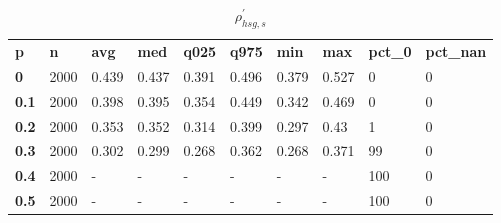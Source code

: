 \begin{table}[h]
 \centering 
\footnotesize
\caption{$\rho_{hsg,s}^\prime $}
\label{tab:alphahsgs}
\begin{tabular}[h]{| l l l l l l l l l l|
    } \hline
\textbf{ p} & \textbf{ n} & \textbf{ avg} & \textbf{ med} & \textbf{ q025} & \textbf{ q975} & \textbf{ min} & \textbf{ max} & \textbf{ pct\_0} & \textbf{ pct\_nan}
           \\
  \textbf{  0} & 2000 & 0.439 & 0.437 & 0.391 & 0.496 & 0.379 & 0.527 &   0 & 0
           \\
  \textbf{0.1} & 2000 & 0.398 & 0.395 & 0.354 & 0.449 & 0.342 & 0.469 &   0 & 0
           \\
  \textbf{0.2} & 2000 & 0.353 & 0.352 & 0.314 & 0.399 & 0.297 &  0.43 &   1 & 0
           \\
  \textbf{0.3} & 2000 & 0.302 & 0.299 & 0.268 & 0.362 & 0.268 & 0.371 &  99 & 0
           \\
  \textbf{0.4} & 2000 & - & - & - & - & - & - & 100 & 0
           \\
  \textbf{0.5} & 2000 & - & - & - & - & - & - & 100 & 0
           \\
 \hline \end{tabular}
 \end{table}

